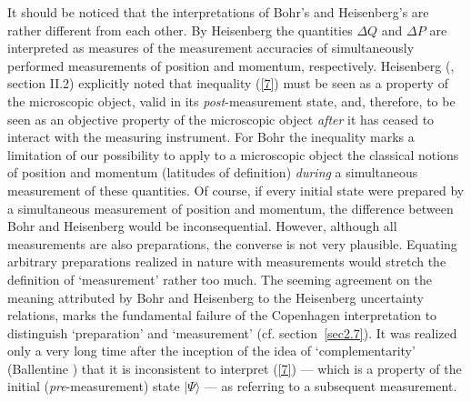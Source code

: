\documentclass[12pt]{article}
\begin{document}
It should be noticed that the interpretations of Bohr's and
Heisenberg's are rather different from each other. By Heisenberg
the quantities $\Delta Q$ and $\Delta P$ are interpreted as
measures of the measurement accuracies of simultaneously performed
measurements of position and momentum, respectively. Heisenberg
(\cite{Heis30}, section II.2) explicitly noted that inequality
(\ref{7}) must be seen as a property of the microscopic object,
valid in its {\em post}-measurement state, and, therefore, to be
seen as an objective property of the microscopic object {\em
after} it has ceased to interact with the measuring instrument.
For Bohr the inequality marks a limitation of our possibility to
apply to a microscopic object the classical notions of position
and momentum (latitudes of definition) {\em during} a simultaneous
measurement of these quantities. Of course, if every initial state
were prepared by a simultaneous measurement of position and
momentum, the difference between Bohr and Heisenberg would be
inconsequential. However, although all measurements are also
preparations, the converse is not very plausible. Equating
arbitrary preparations realized in nature with measurements would
stretch the definition of `measurement' rather too much. The
seeming agreement on the meaning attributed by Bohr and Heisenberg
to the Heisenberg uncertainty relations, marks the fundamental
failure of the Copenhagen interpretation to distinguish
`preparation' and `measurement' (cf. section~\ref{sec2.7}). It was
realized only a very long time after the inception of the idea of
`complementarity' (Ballentine \cite{Bal70}) that it is
inconsistent to interpret (\ref{7}) --- which is a property of the
initial ({\em pre}-measurement) state $|\Psi\rangle$ --- as referring
to a subsequent measurement.
\end{document}
